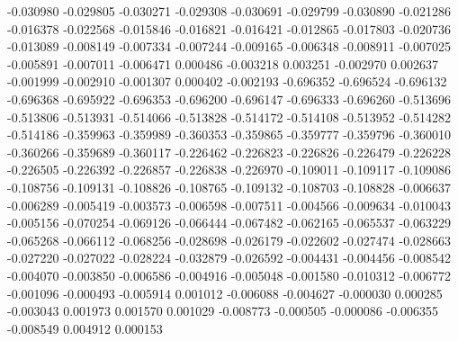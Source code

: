 -0.030980
-0.029805
-0.030271
-0.029308
-0.030691
-0.029799
-0.030890
-0.021286
-0.016378
-0.022568
-0.015846
-0.016821
-0.016421
-0.012865
-0.017803
-0.020736
-0.013089
-0.008149
-0.007334
-0.007244
-0.009165
-0.006348
-0.008911
-0.007025
-0.005891
-0.007011
-0.006471
0.000486
-0.003218
0.003251
-0.002970
0.002637
-0.001999
-0.002910
-0.001307
0.000402
-0.002193
-0.696352
-0.696524
-0.696132
-0.696368
-0.695922
-0.696353
-0.696200
-0.696147
-0.696333
-0.696260
-0.513696
-0.513806
-0.513931
-0.514066
-0.513828
-0.514172
-0.514108
-0.513952
-0.514282
-0.514186
-0.359963
-0.359989
-0.360353
-0.359865
-0.359777
-0.359796
-0.360010
-0.360266
-0.359689
-0.360117
-0.226462
-0.226823
-0.226826
-0.226479
-0.226228
-0.226505
-0.226392
-0.226857
-0.226838
-0.226970
-0.109011
-0.109117
-0.109086
-0.108756
-0.109131
-0.108826
-0.108765
-0.109132
-0.108703
-0.108828
-0.006637
-0.006289
-0.005419
-0.003573
-0.006598
-0.007511
-0.004566
-0.009634
-0.010043
-0.005156
-0.070254
-0.069126
-0.066444
-0.067482
-0.062165
-0.065537
-0.063229
-0.065268
-0.066112
-0.068256
-0.028698
-0.026179
-0.022602
-0.027474
-0.028663
-0.027220
-0.027022
-0.028224
-0.032879
-0.026592
-0.004431
-0.004456
-0.008542
-0.004070
-0.003850
-0.006586
-0.004916
-0.005048
-0.001580
-0.010312
-0.006772
-0.001096
-0.000493
-0.005914
0.001012
-0.006088
-0.004627
-0.000030
0.000285
-0.003043
0.001973
0.001570
0.001029
-0.008773
-0.000505
-0.000086
-0.006355
-0.008549
0.004912
0.000153
